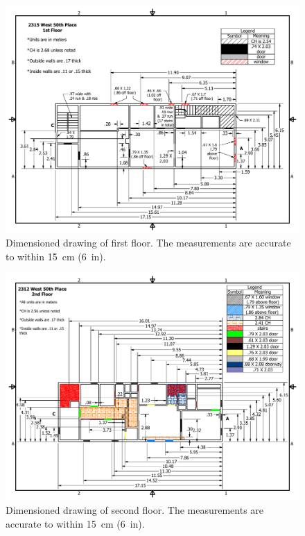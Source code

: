 \begin{figure}[!ht]
\centering
\includegraphics[width=1\textwidth]{../Figures/50th_Place_1st_Floor}
\caption[Dimensioned drawing of first floor.]{Dimensioned drawing of first floor. The measurements are accurate to within 15~cm (6~in).}
\label{fig:first_floor}
\end{figure}

\begin{figure}[!ht]
\centering
\includegraphics[width=1\textwidth]{../Figures/50th_Place_2nd_Floor}
\caption[Dimensioned drawing of second floor.]{Dimensioned drawing of second floor. The measurements are accurate to within 15~cm (6~in).}
\label{fig:second_floor}
\end{figure}

